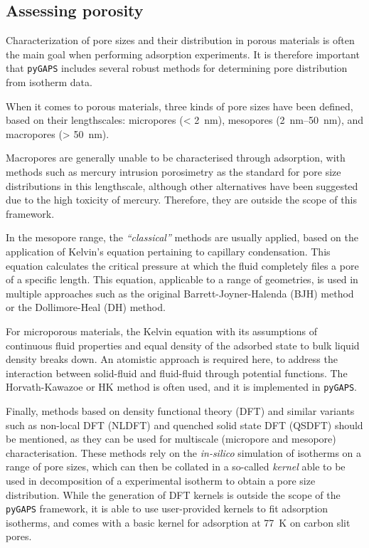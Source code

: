 
\subsection{Assessing porosity}

Characterization of pore sizes and their distribution in porous materials
is often the main goal when performing adsorption experiments. It is
therefore important that \texttt{pyGAPS} includes several robust methods
for determining pore distribution from isotherm data.

When it comes to porous materials, three kinds of pore sizes have been
defined, based on their lengthscales: micropores (\SI{< 2}{\nano\metre}),
mesopores (\SIrange{2}{50}{\nano\metre}), and macropores (\SI{> 50}{\nano\metre}).

Macropores are generally unable to be characterised through adsorption, with
methods such as mercury intrusion porosimetry as the standard for pore
size distributions in this lengthscale, although other alternatives have
been suggested~\cite{rouquerolCharacterizationMacroporousSolids2012} due
to the high toxicity of mercury. Therefore, they are outside the scope
of this framework.

In the mesopore range, the \textit{``classical''} methods are usually applied,
based on the application of Kelvin's equation pertaining to capillary
condensation. This equation calculates the critical pressure at which
the fluid completely files a pore of a specific length. This equation,
applicable to a range of geometries, is used in multiple approaches
such as the original Barrett-Joyner-Halenda (BJH) method or the
Dollimore-Heal (DH) method.

For microporous materials, the Kelvin equation with its assumptions
of continuous fluid properties and equal density of the adsorbed
state to bulk liquid density breaks down. An atomistic approach
is required here, to address the interaction between solid-fluid
and fluid-fluid through potential functions. The Horvath-Kawazoe or
HK method is often used, and it is implemented in \texttt{pyGAPS}.

Finally, methods based on density functional theory (DFT) and similar
variants such as non-local DFT (NLDFT) and quenched solid state DFT
(QSDFT) should be mentioned, as they can be used for multiscale
(micropore and mesopore) characterisation. These methods rely on the
\textit{in-silico} simulation of isotherms on a range of pore sizes,
which can then be collated in a so-called \textit{kernel} able to
be used in decomposition of a experimental isotherm to obtain a
pore size distribution. While the generation of DFT kernels is
outside the scope of the \texttt{pyGAPS} framework, it is able to use
user-provided kernels to fit adsorption isotherms, and comes with
a basic kernel for  adsorption at \SI{77}{\kelvin} on carbon slit pores.

